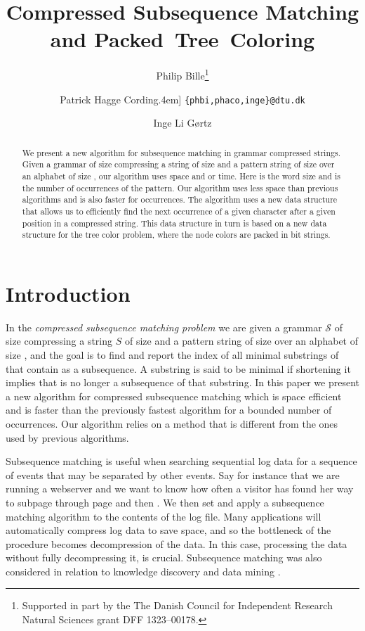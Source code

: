 \documentclass[11pt]{article}
\title{Compressed Subsequence Matching and Packed~Tree~Coloring}
\author{Philip Bille\thanks{Supported in part by the The Danish Council for Independent Research  Natural Sciences grant DFF ­1323--00178.} \and Patrick Hagge Cording\0.4em]
\texttt{\small{\{phbi,phaco,inge\}@dtu.dk}} \and Inge Li G\o rtz\footnotemark[1]}
\newcommand{\str}{\ensuremath{S} }
\newcommand{\slp}{\ensuremath{\mathcal{S}} }
\begin{document}
	
\maketitle

\begin{abstract}
\noindent We present a new algorithm for subsequence matching in grammar compressed strings. Given a grammar of size  compressing a string of size  and a pattern string of size  over an alphabet of size , our algorithm uses  space and  or  time. Here  is the word size and  is the number of occurrences of the pattern. Our algorithm uses less space than previous algorithms and is also faster for  occurrences. The algorithm uses a new data structure that allows us to efficiently find the next occurrence of a given character after a given position in a compressed string. This data structure in turn is based on a new data structure for the tree color problem, where the node colors are packed in bit strings.
\end{abstract}


\section{Introduction}


In the  \textit{compressed subsequence matching problem} we are given a grammar \slp of size  compressing a string \str of size  and a pattern string  of size  over an alphabet of size , and the goal is to find and report the index of all minimal substrings of  that contain  as a subsequence. A substring is said to be minimal if shortening it implies that  is no longer a subsequence of that substring. In this paper we present a new algorithm for compressed subsequence matching which is space efficient and is faster than the previously fastest algorithm for a bounded number of occurrences. Our algorithm relies on a method that is different from the ones used by previous algorithms.



Subsequence matching is useful when searching sequential log data for a sequence of events that may be separated by other events. Say for instance that we are running a webserver and we want to know how often a visitor has found her way to subpage  through page  and then . We then set  and apply a subsequence matching algorithm to the contents of the log file. Many applications will automatically compress log data to save space, and so the bottleneck of the procedure becomes decompression of the data. In this case, processing the data without fully decompressing it, is crucial. Subsequence matching was also considered in relation to knowledge discovery and data mining \cite{mannila1997discovery}.
\end{document}
